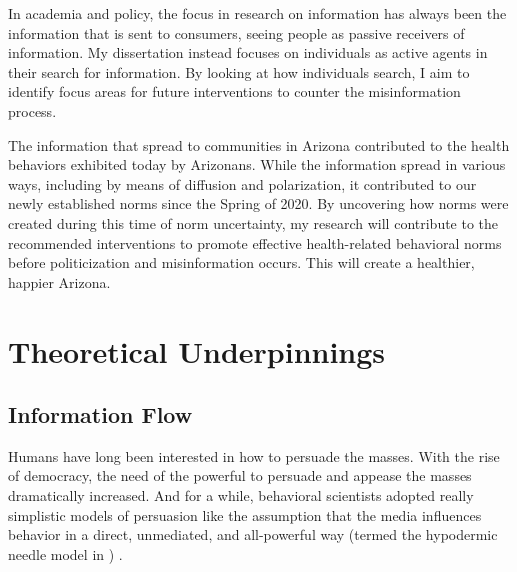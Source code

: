 In academia and policy, the focus in research on information has always been the
information that is sent to consumers, seeing people as passive receivers of
information. My dissertation instead focuses on individuals as active agents in
their search for information. By looking at how individuals search, I aim to
identify focus areas for future interventions to counter the misinformation
process.

The information that spread to communities in Arizona contributed to the health
behaviors exhibited today by Arizonans. While the information spread in various
ways, including by means of diffusion and polarization, it contributed to our
newly established norms since the Spring of 2020. By uncovering how norms were
created during this time of norm uncertainty, my research will contribute to the
recommended interventions to promote effective health-related behavioral norms
before politicization and misinformation occurs. This will create a healthier,
happier Arizona.

\section{Theoretical Underpinnings}

\subsection{Information Flow}

Humans have long been interested in how to persuade the masses. With the rise of
democracy, the need of the powerful to persuade and appease the masses
dramatically increased. And for a while, behavioral scientists adopted really
simplistic models of persuasion like the assumption that the media influences
behavior in a direct, unmediated, and all-powerful way (termed the hypodermic
needle model in \citet{bineham1988historical}) \citep{lasswellpropaganda}.

